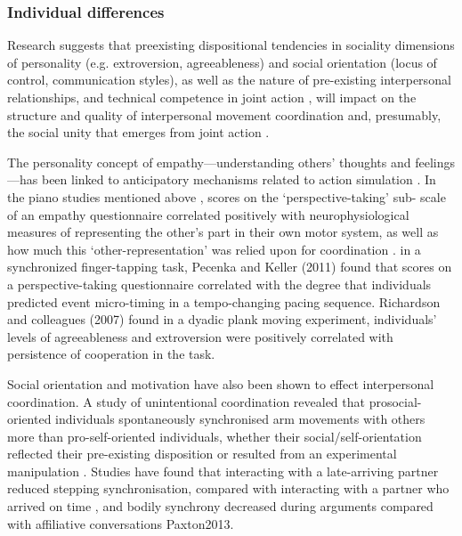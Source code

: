 \begin{CJK}{UTF8}{gbsn}
  \subsubsection{Individual differences}


  Research suggests that preexisting dispositional tendencies in sociality dimensions of personality (e.g. extroversion, agreeableness) and social orientation (locus of control, communication styles), as well as the nature of pre-existing interpersonal relationships, and technical competence in joint action \citep{Novembre2014}, will impact on the structure and quality of interpersonal movement coordination and, presumably, the social unity that emerges from joint action \citep{Marsh2009}.

  The personality concept of empathy—understanding others’ thoughts and feelings—has been linked to anticipatory mechanisms related to action simulation \citep{Sevdalis2014,Keller2014}.  In the piano studies mentioned above \citep{Novembre2012}, scores on the ‘perspective-taking’ sub- scale of an empathy questionnaire correlated positively with neurophysiological measures of representing the other’s part in their own motor system, as well as how much this ‘other-representation’ was relied upon for coordination \citep{Novembre2014a}.
  in a synchronized finger-tapping task, Pecenka and Keller (2011) found that scores on a perspective-taking questionnaire correlated with the degree that individuals predicted event micro-timing in a tempo-changing pacing sequence.  Richardson and colleagues (2007) found in a dyadic plank moving experiment, individuals’ levels of agreeableness and extroversion were positively correlated with persistence of cooperation in the task.

  Social orientation and motivation have also been shown to effect interpersonal coordination.  A study of unintentional coordination revealed that prosocial-oriented individuals spontaneously synchronised arm movements with others more than pro-self-oriented individuals, whether their social/self-orientation reflected their pre-existing disposition or resulted from an experimental manipulation \citep{Lumsden2012}.  Studies have found that interacting with a late-arriving partner reduced stepping synchronisation, compared with interacting with a partner who arrived on time \citep{Miles2010}, and bodily synchrony decreased during arguments compared with affiliative conversations Paxton2013.


\end{CJK}

